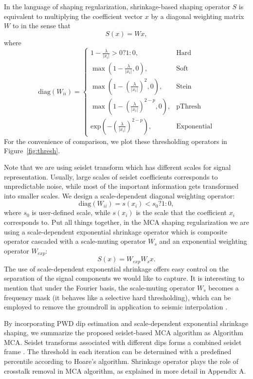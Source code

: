  In the language of shaping regularization, shrinkage-based shaping operator $S$ is equivalent to multiplying the coefficient vector $x$ by a diagonal weighting matrix $W$ to in the sense that
\begin{equation}
 S(x)=Wx,
\end{equation}
where 
\begin{equation}
 \mathrm{diag}(W_{ii})=
 \begin{cases}
 1-\frac{\lambda}{|x_i|}>0?1:0, & \mathrm{Hard}\\
 \max(1-\frac{\lambda}{|x_i|},0), & \mathrm{Soft}\\
 \max(1-\left(\frac{\lambda}{|x_i|}\right)^2,0), & \mathrm{Stein}\\
 \max(1-\left(\frac{\lambda}{|x_i|}\right)^{2-p},0), & \mathrm{pThresh}\\
 \mathrm{exp}(-(\frac{\lambda}{|x_i|})^{2-p}),& \mathrm{Exponential}
 \end{cases}
\end{equation}
For the convenience of comparison, we plot these thresholding operators in Figure~\ref{fig:thresh}. 


Note that we are using seislet transform which has different scales for signal representation. Usually, large scales of seislet coefficients corresponds to unpredictable noise, while most of the important information gets transformed into smaller scales. We design a scale-dependent diagonal weighting operator:
\begin{equation}
 \mathrm{diag}(W_{ii})= s(x_i)<s_0?1:0,
\end{equation}
where $s_0$ is user-defined scale, while $s(x_i)$ is the scale that the coefficient $x_i$ corresponds to.  Put all things together, in the MCA shaping regularization we are using a scale-dependent exponential shrinkage operator which is composite operator cascaded with a scale-muting operator $W_{s}$ and an exponential weighting operator $W_{exp}$:
\begin{equation}
 S(x)=W_{exp} W_s x.
\end{equation}
The use of scale-dependent exponential shrinkage offers easy control on the separation of the signal components we would like to capture. It is interesting to mention that under the Fourier basis, the scale-muting operator $W_s$ becomes a frequency mask (it behaves like a selective hard thresholding), which can be employed to remove the groundroll in application to seismic interpolation \citep{gholami2014non}.


By incorporating PWD dip estimation and scale-dependent exponential shrinkage shaping, we summarize the proposed seislet-based MCA algorithm as Algorithm MCA. Seislet transforms associated with different dips forms a combined seislet frame \citep{fomel2010seislet}. The threshold in each iteration can be determined with a predefined percentile according to Hoare's algorithm. Shrinkage operator plays the role of crosstalk removal in MCA algorithm, as explained in more detail in Appendix A.




